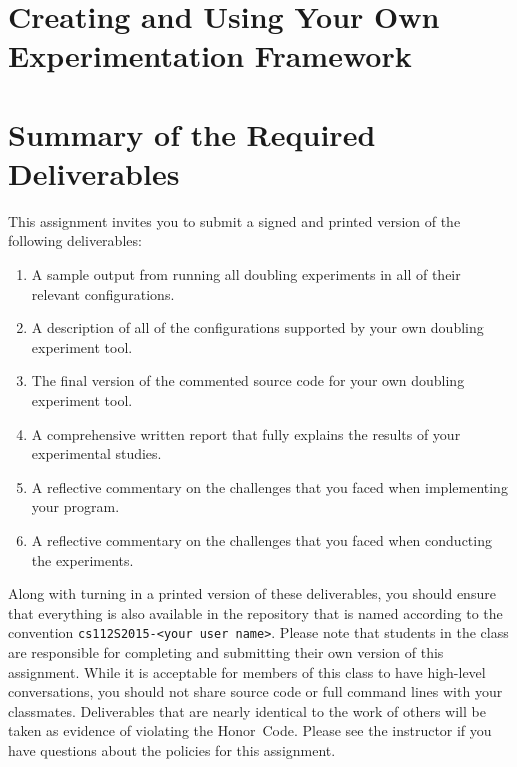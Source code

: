 \section*{Creating and Using Your Own Experimentation Framework}



\section*{Summary of the Required Deliverables}

  This assignment invites you to submit a signed and printed version of the following deliverables:

  \begin{enumerate}
  \itemsep0pt

  \item A sample output from running all doubling experiments in all of their relevant configurations.

  \item A description of all of the configurations supported by your own doubling experiment tool.

  \item The final version of the commented source code for your own doubling experiment tool.

  \item A comprehensive written report that fully explains the results of your experimental studies.

  \item A reflective commentary on the challenges that you faced when implementing your program.

  \item A reflective commentary on the challenges that you faced when conducting the experiments.

  \end{enumerate}

  Along with turning in a printed version of these deliverables, you should ensure that everything is also available in
  the repository that is named according to the convention {\tt cs112S2015-<your user name>}. Please note that students
  in the class are responsible for completing and submitting their own version of this assignment.    While it is
  acceptable for members of this class to have high-level conversations, you should not share source code or full
  command lines with your classmates.  Deliverables that are nearly identical to the work of others will be taken as
  evidence of violating the \mbox{Honor Code}.  Please see the instructor if you have questions about the policies for
  this assignment.

  
